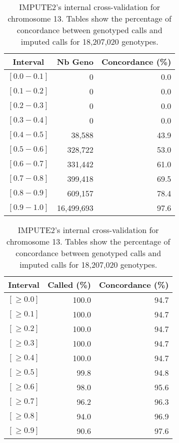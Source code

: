\documentclass[10pt,twoside,english]{scrartcl}
\begin{document}
\begin{table}[H]
\protect\caption{IMPUTE2's internal cross-validation for chromosome 13. Tables show the
percentage of concordance between genotyped calls and imputed calls
for 18,207,020 genotypes.\label{tab:cross_validation_chr_13}}

\centering

\begin{tabular}{crr}
\hline 
\multicolumn{1}{c}{\textbf{Interval}}
 & \multicolumn{1}{c}{\textbf{Nb Geno}}
 & \multicolumn{1}{c}{\textbf{Concordance (\%)}}
\\
\hline 

$[0.0-0.1]$ & 0 & 0.0\\
$[0.1-0.2]$ & 0 & 0.0\\
$[0.2-0.3]$ & 0 & 0.0\\
$[0.3-0.4]$ & 0 & 0.0\\
$[0.4-0.5]$ & 38,588 & 43.9\\
$[0.5-0.6]$ & 328,722 & 53.0\\
$[0.6-0.7]$ & 331,442 & 61.0\\
$[0.7-0.8]$ & 399,418 & 69.5\\
$[0.8-0.9]$ & 609,157 & 78.4\\
$[0.9-1.0]$ & 16,499,693 & 97.6\\
\hline 
\end{tabular}
\hfill
\begin{tabular}{crr}
\hline 
\multicolumn{1}{c}{\textbf{Interval}}
 & \multicolumn{1}{c}{\textbf{Called (\%)}}
 & \multicolumn{1}{c}{\textbf{Concordance (\%)}}
\\
\hline 

$[\geq 0.0]$ & 100.0 & 94.7\\
$[\geq 0.1]$ & 100.0 & 94.7\\
$[\geq 0.2]$ & 100.0 & 94.7\\
$[\geq 0.3]$ & 100.0 & 94.7\\
$[\geq 0.4]$ & 100.0 & 94.7\\
$[\geq 0.5]$ & 99.8 & 94.8\\
$[\geq 0.6]$ & 98.0 & 95.6\\
$[\geq 0.7]$ & 96.2 & 96.3\\
$[\geq 0.8]$ & 94.0 & 96.9\\
$[\geq 0.9]$ & 90.6 & 97.6\\
\hline 
\end{tabular}


\end{table}
\end{document}
